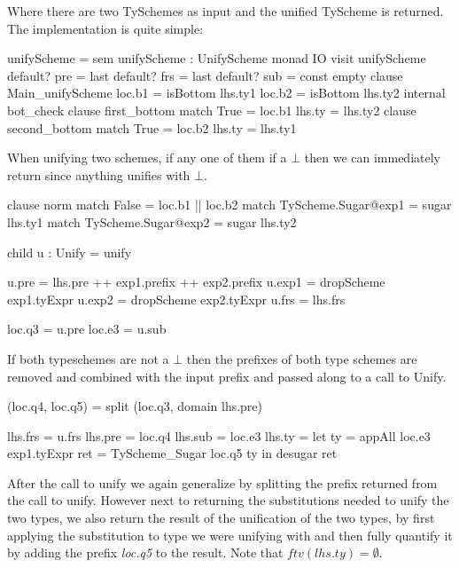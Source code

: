 Where there are two TySchemes as input and the unified TyScheme is returned. The implementation is quite simple:

\begin{code}
unifyScheme = sem unifyScheme : UnifyScheme monad IO
                visit unifyScheme
                  default? pre = last
                  default? frs = last
                  default? sub = const empty
                  clause Main_unifyScheme
                      loc.b1 = isBottom lhs.ty1
                      loc.b2 = isBottom lhs.ty2
                      internal bot_check
                        clause first_bottom
                            match True = loc.b1
                            lhs.ty     = lhs.ty2
                        clause second_bottom
                            match True = loc.b2
                            lhs.ty     = lhs.ty1
\end{code}
When unifying two schemes, if any one of them if a $\bot$ then we can immediately return since anything unifies with $\bot$. 

\begin{code}
                        clause norm
                            match False = loc.b1 || loc.b2
                            match TyScheme.Sugar@exp1 = sugar lhs.ty1
                            match TyScheme.Sugar@exp2 = sugar lhs.ty2
                                
                            child u : Unify = unify
                                
                            u.pre  = lhs.pre ++ exp1.prefix ++ exp2.prefix
                            u.exp1 = dropScheme exp1.tyExpr
                            u.exp2 = dropScheme exp2.tyExpr
                            u.frs  = lhs.frs
                                
                            loc.q3 = u.pre
                            loc.e3 = u.sub
\end{code}
If both typeschemes are not a $\bot$ then the prefixes of both type schemes are removed and combined with the input prefix and passed along to a call to Unify.

\begin{code}
                                
                            (loc.q4, loc.q5) = split (loc.q3, domain lhs.pre)
                                
                            lhs.frs = u.frs
                            lhs.pre = loc.q4
                            lhs.sub = loc.e3
                            lhs.ty  = let ty  = appAll loc.e3 exp1.tyExpr
                                          ret = TyScheme_Sugar loc.q5 ty
                                      in desugar ret
\end{code}
After the call to unify we again generalize by splitting the prefix returned from the call to unify. However next to returning the substitutions needed to unify the two types, we also return the result of the unification of the two types, by first applying the substitution to type we were unifying with and then fully quantify it by adding the prefix \emph{loc.q5} to the result. Note that $ftv(lhs.ty)=\emptyset$.
